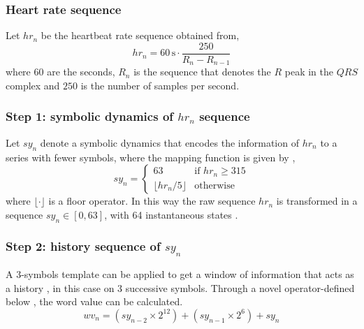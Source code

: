 \subsubsection{Heart rate sequence}
Let $hr_n$ be the heartbeat rate sequence obtained from,
\begin{equation}
hr_n = 60\, \text{s} \cdot \frac{250}{R_n - R_{n-1}}
\end{equation}
where $60$ are the seconds, $R_n$ is the sequence that denotes the $R$ peak in the $QRS$ complex and $250$ is the number of samples per second.
\subsubsection{Step 1: symbolic dynamics of $hr_n$ sequence}
Let $sy_n$ denote a symbolic dynamics that encodes the information of $hr_n$ to a series with fewer symbols, where the mapping function is given by \cite[p. 3]{zhou2015},
\begin{equation}
sy_n = \begin{cases}
63 & \text{if $hr_n \ge 315$} \\
\lfloor hr_n / 5 \rfloor & \text{otherwise}
\end{cases}
\end{equation}
where $\lfloor \cdot \rfloor$ is a floor operator. In this way the raw sequence $hr_n$ is transformed in a sequence $sy_n \in [0, 63]$, with 64 instantaneous states .
\subsubsection{Step 2: history sequence of $sy_n$}
A 3-symbols template can be applied to get a window of information that acts as a history , in this case on 3 successive symbols. Through a novel operator-defined below \cite[p. 3]{zhou2015}, the word value can be calculated. 
\begin{equation}
wv_n = (sy_{n-2} \times 2^{12}) + (sy_{n-1} \times 2^{6}) + sy_n
\end{equation}
